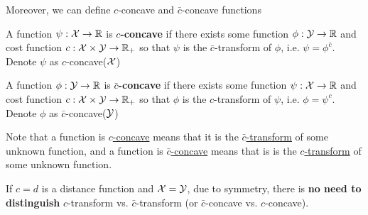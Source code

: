 \documentclass[11pt]{article}
\begin{document}
Moreover, we can define $c$-concave and $\bar{c}$-concave functions
\begin{definition}
A function $\psi: {\mathcal X} \rightarrow {\mathbb R}$ is \textbf{$c$-concave} if there exists some function $\phi: {\mathcal Y} \rightarrow {\mathbb R}$ and cost function $c: {\mathcal X} \times {\mathcal Y} \rightarrow {\mathbb R}_{+}$ so that $\psi$ is the $\bar{c}$-transform of $\phi$, i.e. 
$\psi = \phi^{\bar{c}}$. Denote $\psi$ as $c$-concave(${\mathcal X}$)
\end{definition}
\begin{definition}
A function $\phi: {\mathcal Y} \rightarrow {\mathbb R}$ is \textbf{$\bar{c}$-concave} if there exists some function $\psi: {\mathcal X} \rightarrow {\mathbb R}$ and cost function $c: {\mathcal X} \times {\mathcal Y} \rightarrow {\mathbb R}_{+}$ so that $\phi$ is the $c$-transform of $\psi$, i.e. 
$\phi = \psi^{c}$. Denote $\phi$ as $\bar{c}$-concave(${\mathcal Y}$)
\end{definition}
Note that a function is \underline{$c$-concave} means that it is the \underline{$\bar{c}$-transform} of some unknown function, and a function is \underline{$\bar{c}$-concave} means that is is the \underline{$c$-transform} of some unknown function. 

If $c=d$ is a distance function and ${\mathcal X} = {\mathcal Y}$, due to symmetry, there is \textbf{no need to distinguish} $c$-transform vs. $\bar{c}$-transform (or $\bar{c}$-concave vs. $c$-concave). 
\end{document}
